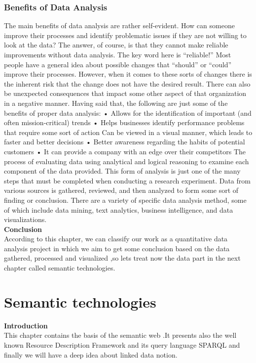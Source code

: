 \documentclass[a4paper,12pt,oneside]{report}
\begin{document}
{{\subsection{Benefits of Data Analysis}
{The main benefits of data analysis are rather self-evident. How can someone improve their processes and identify problematic issues if they are not willing to look at the data? The answer, of course, is that they cannot make reliable improvements without data analysis. The key word here is “reliable!” Most people have a general idea about possible changes that “should” or “could” improve their processes. However, when it comes to these sorts of changes there is the inherent risk that the change does not have the desired result. There can also be unexpected consequences that impact some other aspect of that organization in a negative manner. Having said that, the following are just some of the benefits of proper data analysis:
•	Allows for the identification of important (and often mission-critical) trends
•	Helps businesses identify performance problems that require some sort of action Can be viewed in a visual manner, which leads to faster and better decisions
•	Better awareness regarding the habits of potential customers
•	It can provide a company with an edge over their competitors
The process of evaluating data using analytical and logical reasoning to examine each component of the data provided. This form of analysis is just one of the many steps that must be completed when conducting a research experiment. Data from various sources is gathered, reviewed, and then analyzed to form some sort of finding or conclusion. There are a variety of specific data analysis method, some of which include data mining, text analytics, business intelligence, and data visualizations.}\\

\textbf{Conclusion}\\
{According to this chapter, we can classify our work as a quantitative data analysis project in which we aim to get some conclusion based on the data gathered, processed and visualized ,so lets treat now the data part in the next chapter called semantic technologies.}
\chapter{Semantic technologies}
\textbf{Introduction}\\
{This chapter contains the basis of the semantic web .It presents also the well known Resource Description Framework and its query language SPARQL and finally we will have a deep idea about linked data notion.}
}}
\end{document}
